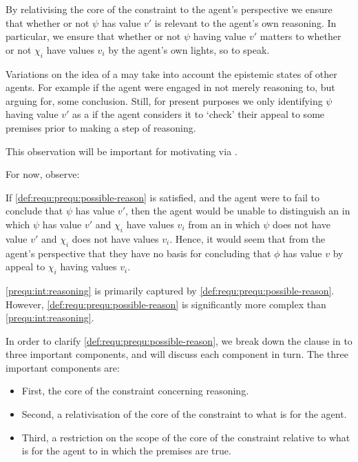 
\begin{note}[Relevance]
  By relativising the core of the constraint to the agent's perspective we ensure that whether or not \(\psi\) has value \(v'\) is relevant to the agent's own reasoning.
  In particular, we ensure that whether or not \(\psi\) having value \(v'\) matters to whether or not \(\chi_{i}\) have values \(v_{i}\) by the agent's own lights, so to speak.

  Variations on the idea of a \prequ{} may take into account the epistemic states of other agents. For example if the agent were engaged in not merely reasoning to, but arguing for, some conclusion.
  Still, for present purposes we only identifying \(\psi\) having value \(v'\) as a \prequ{} if the agent considers it \epVAd{} to `check' their appeal to some premises prior to making a step of reasoning.

  This observation will be important for motivating \ideaCS{} via \ideaS{}.

  For now, observe:

  If \ref{def:requ:prequ:possible-reason} is satisfied, and the agent were to fail to conclude that \(\psi\) has value \(v'\), then the agent would be unable to distinguish an \epVW{} in which \(\psi\) has value \(v'\) and \(\chi_{i}\) have values \(v_{i}\) from an \epVW{} in which \(\psi\) does not have value \(v'\) and \(\chi_{i}\) does not have values \(v_{i}\).
  Hence, it would seem that from the agent's perspective that they have no basis for concluding that \(\phi\) has value \(v\) by appeal to \(\chi_{i}\) having values \(v_{i}\).
\end{note}


\begin{note}
  \ref{prequ:int:reasoning} is primarily captured by \ref{def:requ:prequ:possible-reason}.
  However, \ref{def:requ:prequ:possible-reason} is significantly more complex than \ref{prequ:int:reasoning}.

  In order to clarify \ref{def:requ:prequ:possible-reason}, we break down the clause in to three important components, and will discuss each component in turn.
  The three important components are:
  \begin{itemize}
  \item
    First, the core of the constraint concerning reasoning.
  \item
    Second, a relativisation of the core of the constraint to what is \epVAd{} for the agent.
  \item
    Third, a restriction on the scope of the core of the constraint relative to what is \epVAd{} for the agent to  in which the premises are true.
  \end{itemize}
\end{note}

